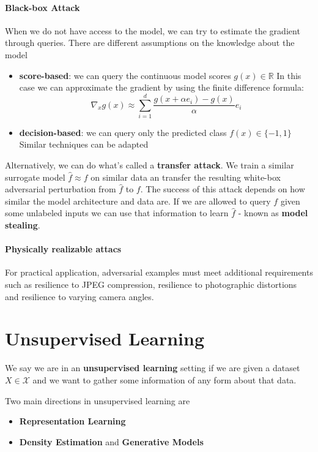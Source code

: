 \documentclass{article}
\newcommand{\R}{\mathbb{R}}
\begin{document}
\paragraph{Black-box Attack}

When we do not have access to the model, we can try to estimate the gradient through queries.
There are different assumptions on the knowledge about the model
\begin{itemize}
    \item \textbf{score-based}: we can query the continuous model scores $g(x) \in \R$
	In this case we can approximate the gradient by using the finite difference formula:
	$$
	\nabla_x g(x) \approx \sum_{i=1}^d \frac{g(x+\alpha e_i) - g(x)}{\alpha}e_i
	$$
    \item \textbf{decision-based}: we can query only the predicted class $f(x) \in \{-1, 1\}$
	Similar techniques can be adapted
\end{itemize}

Alternatively, we can do what's called a \textbf{transfer attack}.
We train a similar surrogate model $\hat{f} \approx f$ on similar data an transfer the resulting white-box adversarial perturbation from $\hat{f}$ to $f$.
The success of this attack depends on how similar the model architecture and data are.
If we are allowed to query $f$ given some unlabeled inputs we can use that information to learn $\hat{f}$ - known as \textbf{model stealing}.

\paragraph{Physically realizable attacs}

For practical application, adversarial examples must meet additional requirements such as resilience to JPEG compression, resilience to photographic distortions and resilience to varying camera angles.

\section{Unsupervised Learning}

We say we are in an \textbf{unsupervised learning} setting if we are given a dataset $X \in \mathcal{X}$ and we want to gather some information of any form about that data.

Two main directions in unsupervised learning are
\begin{itemize}
    \item \textbf{Representation Learning}
    \item \textbf{Density Estimation} and \textbf{Generative Models}
\end{itemize}
\end{document}
